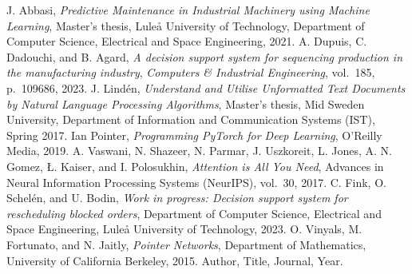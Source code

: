\documentclass[12pt,a4paper]{report}
\begin{document}
\begin{thebibliography}{99}
J. Abbasi, \textit{Predictive Maintenance in Industrial Machinery using Machine Learning}, 
Master’s thesis, Luleå University of Technology, Department of Computer Science, Electrical and Space Engineering, 2021.
A. Dupuis, C. Dadouchi, and B. Agard, 
        \textit{A decision support system for sequencing production in the manufacturing industry},
\textit{Computers \& Industrial Engineering}, vol.~185, p.~109686, 2023. 
 J. Lindén, 
    \textit{Understand and Utilise Unformatted Text Documents by Natural Language Processing Algorithms}, 
    Master’s thesis, Mid Sweden University, Department of Information and Communication Systems (IST), Spring 2017.
 Ian Pointer,
\textit{Programming PyTorch for Deep Learning},
O'Reilly Media, 2019.
A. Vaswani, N. Shazeer, N. Parmar, J. Uszkoreit, L. Jones, 
A. N. Gomez, Ł. Kaiser, and I. Polosukhin, 
\textit{Attention is All You Need}, Advances in Neural Information Processing Systems (NeurIPS), vol.~30, 2017.
C. Fink, O. Schelén, and U. Bodin, 
\textit{Work in progress: Decision support system for rescheduling blocked orders}, 
Department of Computer Science, Electrical and Space Engineering, Luleå University of Technology, 2023.
 O. Vinyals, M. Fortunato, and N. Jaitly, 
    \textit{Pointer Networks}, 
    Department of Mathematics, University of California Berkeley, 2015.
 Author, Title, Journal, Year.
\end{thebibliography}
\end{document}
